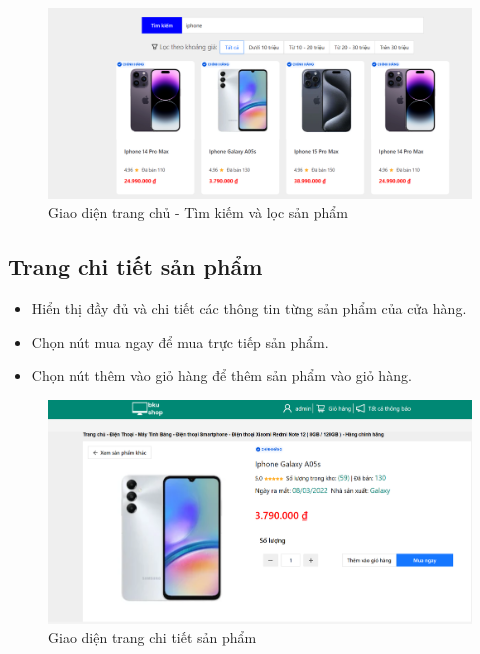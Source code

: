 \begin{figure}[H]
    \begin{center}
    \includegraphics[scale=0.4]{images/hieu/chap-5/search.png}
    \vspace*{3mm}
    \caption{Giao diện trang chủ - Tìm kiếm và lọc sản phẩm }
    \end{center}
\end{figure}
\subsection{Trang chi tiết sản phẩm}
\begin{itemize}
    \item Hiển thị đầy đủ và chi tiết các thông tin từng sản phẩm của cửa hàng.
    \item Chọn nút mua ngay để mua trực tiếp sản phẩm.
    \item Chọn nút thêm vào giỏ hàng để thêm sản phẩm vào giỏ hàng.
\end{itemize}
\begin{figure}[H]
    \begin{center}
    \includegraphics[scale=0.4]{images/hieu/chap-5/product-detail.png}
    \vspace*{3mm}
    \caption{Giao diện trang chi tiết sản phẩm}
    \end{center}
\end{figure}
